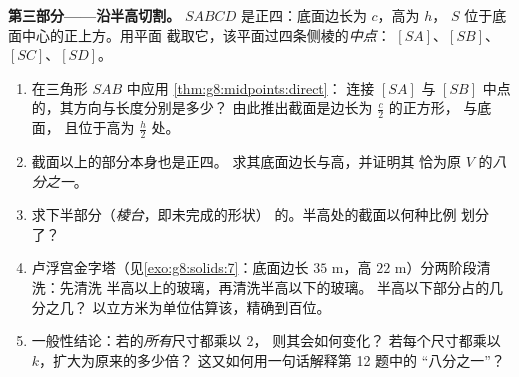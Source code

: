 \begin{problem}
\medskip
\noindent\textbf{第三部分——沿半高切割。}
$SABCD$ 是正四：底面边长为 $c$，高为
$h$， $S$ 位于底面中心的正上方。用平面
截取它，该平面过四条侧棱的\emph{中点}：
$[SA]$、$[SB]$、$[SC]$、$[SD]$。
\begin{enumerate}[resume]
  \item 在三角形 $SAB$ 中应用
        \cref{thm:g8:midpoints:direct}：
        连接 $[SA]$ 与 $[SB]$ 中点的，其方向与长度分别是多少？
        由此推出截面是边长为 $\frac{c}{2}$ 的正方形，
        与底面，
        且位于高为 $\frac{h}{2}$ 处。
  \item 截面以上的部分本身也是正四。
        求其底面边长与高，并证明其
        恰为原 $V$ 的\emph{八分之一}。
  \item 求下半部分（\emph{棱台}，即未完成的形状）
        的。半高处的截面以何种比例
        划分了？
  \item 卢浮宫金字塔（见\cref{exo:g8:solids:7}：底面边长
        $35$ m，高 $22$ m）分两阶段清洗：先清洗
        半高以上的玻璃，再清洗半高以下的玻璃。
        半高以下部分占\emph{}的几分之几？
        以立方米为单位估算该，精确到百位。
  \item 一般性结论：若的\emph{所有}尺寸都乘以 $2$，
        则其会如何变化？
        若每个尺寸都乘以 $k$，扩大为原来的多少倍？
        这又如何用一句话解释第 12 题中的
        “八分之一”？
\end{enumerate}
\end{problem}
